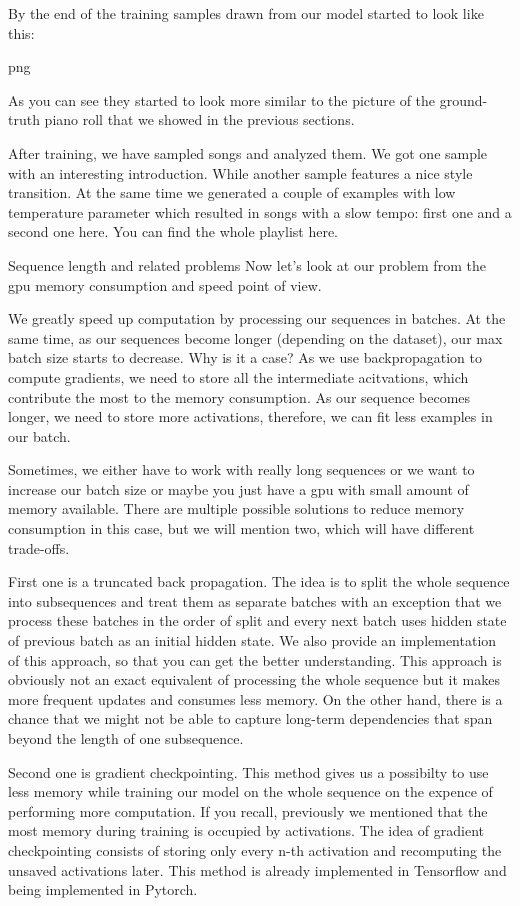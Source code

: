 \documentclass{article}
\begin{document}
By the end of the training samples drawn from our model started to look like this:

png

As you can see they started to look more similar to the picture of the ground-truth piano roll that we showed in the previous sections.

After training, we have sampled songs and analyzed them. We got one sample with an interesting introduction. While another sample features a nice style transition. At the same time we generated a couple of examples with low temperature parameter which resulted in songs with a slow tempo: first one and a second one here. You can find the whole playlist here.

Sequence length and related problems
Now let’s look at our problem from the gpu memory consumption and speed point of view.

We greatly speed up computation by processing our sequences in batches. At the same time, as our sequences become longer (depending on the dataset), our max batch size starts to decrease. Why is it a case? As we use backpropagation to compute gradients, we need to store all the intermediate acitvations, which contribute the most to the memory consumption. As our sequence becomes longer, we need to store more activations, therefore, we can fit less examples in our batch.

Sometimes, we either have to work with really long sequences or we want to increase our batch size or maybe you just have a gpu with small amount of memory available. There are multiple possible solutions to reduce memory consumption in this case, but we will mention two, which will have different trade-offs.

First one is a truncated back propagation. The idea is to split the whole sequence into subsequences and treat them as separate batches with an exception that we process these batches in the order of split and every next batch uses hidden state of previous batch as an initial hidden state. We also provide an implementation of this approach, so that you can get the better understanding. This approach is obviously not an exact equivalent of processing the whole sequence but it makes more frequent updates and consumes less memory. On the other hand, there is a chance that we might not be able to capture long-term dependencies that span beyond the length of one subsequence.

Second one is gradient checkpointing. This method gives us a possibilty to use less memory while training our model on the whole sequence on the expence of performing more computation. If you recall, previously we mentioned that the most memory during training is occupied by activations. The idea of gradient checkpointing consists of storing only every n-th activation and recomputing the unsaved activations later. This method is already implemented in Tensorflow and being implemented in Pytorch.
\end{document}
